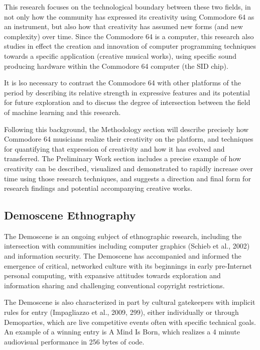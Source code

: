\documentclass[10pt]{article}
\begin{document}
\begin{multicols*}{2}
This research focuses on the technological boundary between these two fields, in not only how the community has expressed its creativity using Commodore 64 as an instrument, but also how that creativity has assumed new forms (and new complexity) over time. Since the Commodore 64 is a computer, this research also studies in effect the creation and innovation of computer programming techniques towards a specific application (creative musical works), using specific sound producing hardware within the Commodore 64 computer (the SID chip).

It is lso necessary to contrast the Commodore 64 with other platforms of the period by describing its relative strength in expressive features and its potential for future exploration and to discuss the degree of intersection between the field of machine learning and this research.

Following this background, the Methodology section will describe precisely how Commodore 64 musicians realize their creativity on the platform, and techniques for quantifying that expression of creativity and how it has evolved and transferred. The Preliminary Work section includes a precise example of how creativity can be described, visualized and demonstrated to rapidly increase over time using those research techniques, and suggests a direction and final form for research findings and potential accompanying creative works.

\subsection{Demoscene Ethnography}

The Demoscene is an ongoing subject of ethnographic research, including the intersection with communities including computer graphics (Schieb et al., 2002) and information security\cite{layerone}. The Demoscene has accompanied and informed the emergence of critical, networked culture with its beginnings in early pre-Internet personal computing\cite{pioneers}, with expansive attitudes towards exploration and information sharing and challenging conventional copyright restrictions.

The Demoscene is also characterized in part by cultural gatekeepers with implicit rules for entry (Impagliazzo et al., 2009, 299), either individually or through Demoparties, which are live competitive events often with specific technical goals. An example of a winning entry is A Mind Is Born\cite{amib}, which realizes a 4 minute audiovisual performance in 256 bytes of code.


\end{multicols*}
\end{document}

